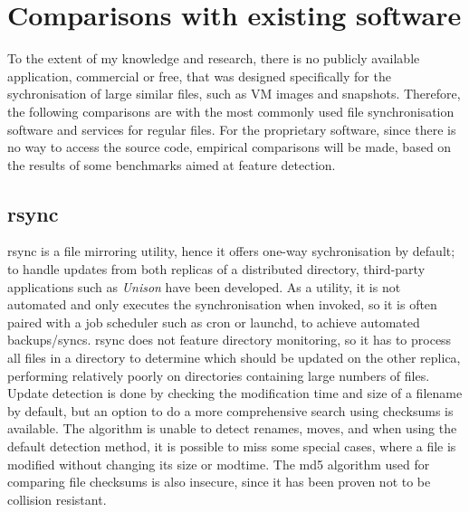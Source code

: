 
\chapter{Comparisons with existing software}
\label{cha:comparisons}
To the extent of my knowledge and research, there is no publicly available application, commercial or free, that was designed specifically for the sychronisation of large similar files, such as VM images and snapshots. Therefore, the following comparisons are with the most commonly used file synchronisation software and services for regular files. For the proprietary software, since there is no way to access the source code, empirical comparisons will be made, based on the results of some benchmarks aimed at feature detection.

\section{rsync}
  rsync is a file mirroring utility, hence it offers one-way sychronisation by default; to handle updates from both replicas of a distributed directory, third-party applications such as \emph{Unison} have been developed. As a utility, it is not automated and only executes the synchronisation when invoked, so it is often paired with a job scheduler such as cron or launchd, to achieve automated backups/syncs. rsync does not feature directory monitoring, so it has to process all files in a directory to determine which should be updated on the other replica, performing relatively poorly on directories containing large numbers of files. Update detection is done by checking the modification time and size of a filename by default, but an option to do a more comprehensive search using checksums is available. The algorithm is unable to detect renames, moves, and when using the default detection method, it is possible to miss some special cases, where a file is modified without changing its size or modtime. The md5 algorithm used for comparing file checksums is also insecure, since it has been proven not to be collision resistant.


